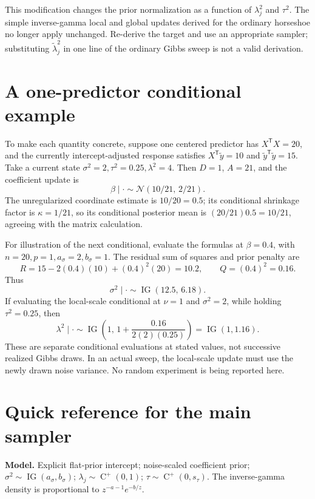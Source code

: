 \documentclass[11pt,letterpaper]{article}
\numberwithin{equation}{section}
\newcommand{\IG}{\operatorname{IG}}
\newcommand{\HC}{\operatorname{C}^{+}}
\newcommand{\Normal}{\mathcal{N}}
\newcommand{\given}{\mid}
\newcommand{\trans}{^{\mathsf T}}
\begin{document}
This modification changes the prior normalization as a function of
\(\lambda_j^2\) and \(\tau^2\). The simple inverse-gamma local and global
updates derived for the ordinary horseshoe no longer apply unchanged.
Re-derive the target and use an appropriate sampler; substituting
\(\widetilde\lambda_j^2\) in one line of the ordinary Gibbs sweep is not
a valid derivation.

\clearpage
\section{A one-predictor conditional example}\label{app:example}

To make each quantity concrete, suppose one centered predictor has
\(X\trans X=20\), and the currently intercept-adjusted response satisfies
\(X\trans\widetilde y=10\) and \(\widetilde y\trans\widetilde y=15\).
Take a current state \(\sigma^2=2,\tau^2=0.25,\lambda^2=4\).
Then \(D=1\), \(A=21\), and the coefficient update is
\[
 \beta\given\cdot\sim\Normal(10/21,\,2/21).
\]
The unregularized coordinate estimate is \(10/20=0.5\); its conditional
shrinkage factor is \(\kappa=1/21\), so its conditional posterior mean
is \((20/21)0.5=10/21\), agreeing with the matrix calculation.

For illustration of the next conditional, evaluate the formulas at
\(\beta=0.4\), with \(n=20,p=1,a_\sigma=2,b_\sigma=1\). The residual
sum of squares and prior penalty are
\[
 R=15-2(0.4)(10)+(0.4)^2(20)=10.2,\qquad Q=(0.4)^2=0.16.
\]
Thus
\[
 \sigma^2\given\cdot\sim\IG\left(12.5,\,6.18\right).
\]
If evaluating the local-scale conditional at \(\nu=1\) and \(\sigma^2=2\),
while holding \(\tau^2=0.25\), then
\[
 \lambda^2\given\cdot\sim\IG\left(1,\,
 1+\frac{0.16}{2(2)(0.25)}\right)=\IG(1,1.16).
\]
These are separate conditional evaluations at stated values, not successive
realized Gibbs draws. In an actual sweep, the local-scale update must use
the newly drawn noise variance. No random experiment is being reported here.

\clearpage
\section{Quick reference for the main sampler}\label{app:quick}

\textbf{Model.} Explicit flat-prior intercept; noise-scaled coefficient prior;
\(\sigma^2\sim\IG(a_\sigma,b_\sigma)\);
\(\lambda_j\sim\HC(0,1)\); \(\tau\sim\HC(0,s_\tau)\).
The inverse-gamma density is proportional to \(z^{-a-1}e^{-b/z}\).
\end{document}

